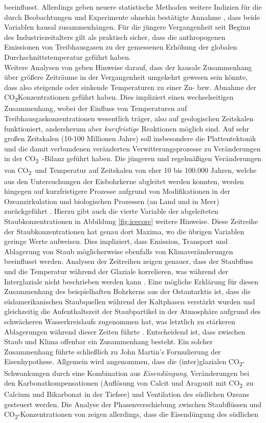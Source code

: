 \documentclass[12pt,a4paper,onecolumn]{scrartcl}
\newcommand{\cotwo}{CO\textsubscript{2}}
\begin{document}
beeinflusst. Allerdings geben neuere statistische Methoden \citep{Stips.2016} weitere Indizien für die durch Beobachtungen und Experimente ohnehin bestätigte Annahme , dass beide Variablen kausal zusammenhängen. Für die jüngere Vergangenheit seit Beginn des Industriezeitalters gilt als praktisch sicher, dass die anthropogenen Emissionen von Treibhausgasen zu der gemessenen Erhöhung der globalen Durchschnittstemperatur geführt haben.  \\

Weitere Analysen von \citet{Stips.2016} geben Hinweise darauf, dass der kausale Zusammenhang über größere Zeiträume in der Vergangenheit umgekehrt gewesen sein könnte, dass also steigende oder sinkende Temperaturen zu einer Zu- bzw. Abnahme der \cotwo Konzentrationen geführt haben. Dies impliziert einen wechselseitigen Zusammenhang, wobei der Einfluss von Temperaturen auf Treibhausgaskonzentrationen wesentlich träger, also auf geologischen Zeitskalen funktioniert, andersherum aber \textit{kurzfristige} Reaktionen möglich sind.  Auf sehr großen Zeitskalen (10-100 Millionen Jahre) soll insbesondere die Plattentektonik und die damit verbundenen veränderten Verwitterungsprozesse zu Veränderungen in der \cotwo \ -Bilanz geführt haben. Die jüngeren und regelmäßigen Veränderungen von \cotwo \ und Temperatur auf Zeitskalen von eher 10 bis 100.000 Jahren, welche aus den Untersuchungen der Eisbohrkerne abgleitet werden konnten, werden hingegen auf kurzfristigere Prozesse aufgrund von Modifikationen in der Ozeanzirkulation und biologischen Prozessen (an Land und in Meer) zurückgeführt \citep{Emerson.2009}. Hierzu gibt auch die vierte Variable der abgeleiteten Staubkonzentrationen in Abbildung \ref{fig:icecore} weitere Hinweise. Diese Zeitreihe der Staubkonzentrationen hat genau dort Maxima, wo die übrigen Variablen geringe Werte aufweisen. Dies impliziert, dass Emission, Transport und Ablagerung von Staub möglicherweise ebenfalls von Klimaveränderungen beeinflusst werden. Analysen der Zeitreihen zeigen genauer, dass der Staubfluss und die Temperatur während der Glaziale korrelieren, was während der Interglaziale nicht beschrieben werden kann \citep{Lambert.2008}. Eine mögliche Erklärung für diesen Zusammenhang des beispielhaften Bohrkerns aus der Ostantarktis ist, dass die südamerikanischen Staubquellen während der Kaltphasen verstärkt wurden und gleichzeitig die Aufenthaltszeit der Staubpartikel in der Atmosphäre aufgrund des schwächeren Wasserkreislaufs zugenommen hat, was letztlich zu stärkeren Ablagerungen während dieser Zeiten führte \citep{Lambert.2008}. Entscheidend ist, dass zwischen Staub und Klima offenbar ein Zusammenhang besteht. Ein solcher Zusammenhang führte schließlich zu John Martin's Formulierung der Eisenhypothese. Allgemein wird angenommen, dass die (inter)glazialen \cotwo -Schwankungen durch eine Kombination aus \textit{Eisendüngung}, Veränderungen bei den Karbonatkompensationen (Auflösung von Calcit und Aragonit mit  \cotwo \ zu Calcium und Bikarbonat in der Tiefsee) und Ventilation des südlichen Ozeans \citep{Lambert.2012} gesteuert werden. Die Analyse der Phasenverschiebung zwischen Staubflüssen und \cotwo -Konzentrationen von \citet{Lambert.2012} zeigen allerdings, dass die Eisendüngung des südlichen 
\end{document}

